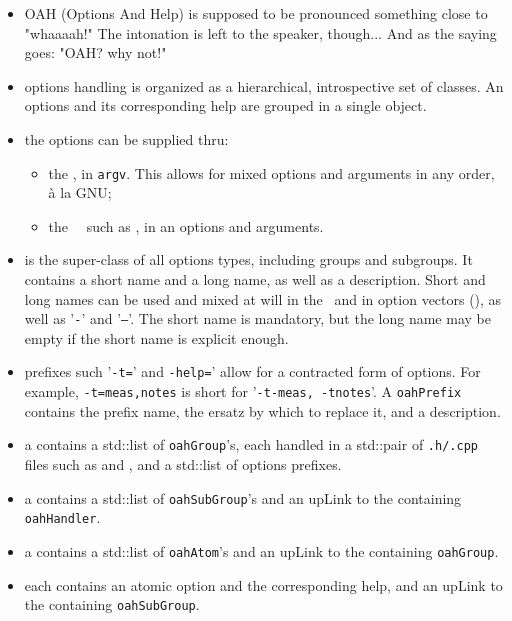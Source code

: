 \begin{itemize}
\item OAH (Options And Help) is supposed to be pronounced something close to "whaaaah!"
    The intonation is left to the speaker, though...
    And as the saying goes: "OAH? why not!"

\item options handling is organized as a hierarchical, introspective set of classes.
    An options and its corresponding help are grouped in a single object.

\item the options can be supplied thru:

\begin{itemize}
    \item the \CLI, in {\tt argv}.
        This allows for mixed options and arguments in any order, à la GNU;
    \item the \API\ \functions\ such as , in an options and arguments.
  \end{itemize}

\item {} is the super-class   of all options types, including groups and subgroups.
    It contains a short name and a long name, as well as a description.
    Short and long names can be used and mixed at will in the \CLI\
    and in option vectors (\API),
    as well as '{\tt -}' and '{\tt --}'.
    The short name is mandatory, but the long name may be empty
    if the short name is explicit enough.

\item prefixes such '{\tt -t=}' and {\tt -help=}' allow for a contracted form of options.
    For example, {\tt -t=meas,notes} is short for '{\tt -t-meas, -tnotes}'.
    A {\tt oahPrefix} contains the prefix name, the ersatz by which to replace it,
    and a description.

\item a  contains a std::list of {\tt oahGroup}'s, each handled
    in a std::pair of {\tt .h/.cpp} files such as \msr{msrOah.h} and ,
    and a std::list of options prefixes.

\item a  contains a std::list of {\tt oahSubGroup}'s
    and an upLink to the containing {\tt oahHandler}.

\item a  contains a std::list of {\tt oahAtom}'s
    and an upLink to the containing {\tt oahGroup}.

\item each  contains an atomic option and the corresponding help,
    and an upLink to the containing {\tt oahSubGroup}.

\end{itemize}


